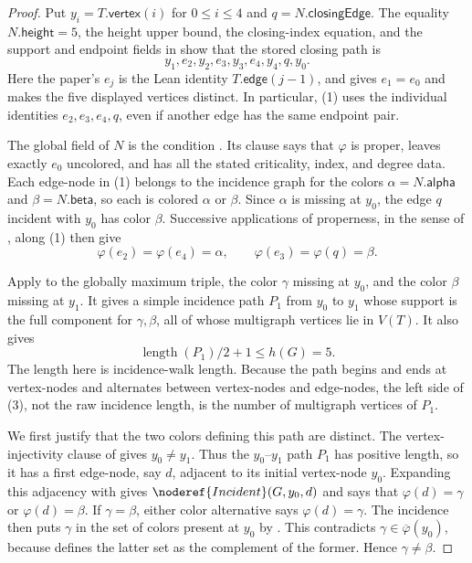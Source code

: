 \begin{proof}
Put $y_i=T.\mathsf{vertex}(i)$ for $0\leq i\leq4$ and
$q=N.\mathsf{closingEdge}$.  The equality
$N.\mathsf{height}=5$, the height upper bound, the closing-index equation,
and the support and endpoint fields in
 show that the stored closing path is
\[
 y_1,e_2,y_2,e_3,y_3,e_4,y_4,q,y_0.                 \tag{1}
\]
Here the paper's $e_j$ is the Lean identity $T.\mathsf{edge}(j-1)$, and
 gives $e_1=e_0$ and makes the five displayed
vertices distinct.  In particular, (1) uses the individual identities
$e_2,e_3,e_4,q$, even if another edge has the same endpoint pair.

The global field of $N$ is the condition
.  Its  clause says that
$\varphi$ is proper, leaves exactly $e_0$ uncolored, and has all the stated
criticality, index, and degree data.  Each edge-node in (1) belongs to the
incidence graph  for the colors
$\alpha=N.\mathsf{alpha}$ and $\beta=N.\mathsf{beta}$, so each is colored
$\alpha$ or $\beta$.  Since $\alpha$ is missing at $y_0$, the edge $q$
incident with $y_0$ has color $\beta$.  Successive applications of
properness, in the sense of , along (1) then
give
\[
 \varphi(e_2)=\varphi(e_4)=\alpha,
 \qquad \varphi(e_3)=\varphi(q)=\beta.              \tag{2}
\]

Apply  to the globally maximum triple,
the color $\gamma$ missing at $y_0$, and the color $\beta$ missing at
$y_1$.  It gives a simple incidence path $P_1$ from $y_0$ to $y_1$ whose
support is the full component
 for $\gamma,\beta$, all of whose multigraph
vertices lie in $V(T)$.  It also gives
\[
 \operatorname{length}(P_1)/2+1\leq h(G)=5.          \tag{3}
\]
The length here is incidence-walk length.  Because the path begins and ends
at vertex-nodes and alternates between vertex-nodes and edge-nodes, the
left side of (3), not the raw incidence length, is the number of multigraph
vertices of $P_1$.

We first justify that the two colors defining this path are distinct.  The
vertex-injectivity clause of  gives $y_0\ne y_1$.
Thus the $y_0$--$y_1$ path $P_1$ has positive length, so it has a first
edge-node, say $d$, adjacent to its initial vertex-node $y_0$.  Expanding
this adjacency with  gives
$\noderef{Incident}(G,y_0,d)$ and says that
$\varphi(d)=\gamma$ or $\varphi(d)=\beta$.  If $\gamma=\beta$, either
color alternative says $\varphi(d)=\gamma$.  The incidence then puts
$\gamma$ in the set of colors present at $y_0$ by
.  This contradicts
$\gamma\in\overline\varphi(y_0)$, because  defines
the latter set as the complement of the former.  Hence
$\gamma\ne\beta$.


\end{proof}
